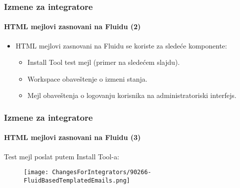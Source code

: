 
\begin{frame}[fragile]
	\frametitle{Izmene za integratore}
	\framesubtitle{HTML mejlovi zasnovani na Fluidu (2)}

	\begin{itemize}
		\item HTML mejlovi zasnovani na Fluidu se koriste za sledeće komponente:

			\begin{itemize}
				\item Install Tool test mejl (primer na sledećem slajdu).
				\item Workspace obaveštenje o izmeni stanja.
				\item Mejl obaveštenja o logovanju korisnika na administratoriski interfejs.
			\end{itemize}

	\end{itemize}

\end{frame}


\begin{frame}[fragile]
	\frametitle{Izmene za integratore}
	\framesubtitle{HTML mejlovi zasnovani na Fluidu (3)}

	Test mejl poslat putem Install Tool-a:

	\begin{figure}
		\texttt{[image: ChangesForIntegrators/90266-FluidBasedTemplatedEmails.png]}
	\end{figure}

\end{frame}


